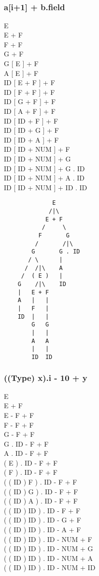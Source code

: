 \subsection{}
\subsubsection{a{[}i+1{]} + b.field}
E \\
E + F \\
F + F \\
G + F \\
G {[} E {]} + F \\
A {[} E {]} + F \\
ID {[} E + F {]} + F \\
ID {[} F + F {]} + F \\
ID {[} G + F {]} + F \\
ID {[} A + F {]} + F \\
ID {[} ID + F {]} + F \\
ID {[} ID + G {]} + F \\
ID {[} ID + A {]} + F \\
ID {[} ID + NUM {]} + F \\
ID {[} ID + NUM {]} + G \\
ID {[} ID + NUM {]} + G . ID \\
ID {[} ID + NUM {]} + A . ID \\
ID {[} ID + NUM {]} + ID . ID

\begin{verbatim}
              E
             /|\
            E + F
           /     \
          F       G
         /       /|\
        G       G . ID
       / \      |
      /  /|\    A
     /  ( E )   |
    G    /|\    ID
    |   E + F
    A   |   |
    |   F   |
    ID  |   |
        G   G
        |   |
        A   A
        |   |
        ID  ID
\end{verbatim}

\subsubsection{((Type) x).i - 10 + y}
E \\
E + F \\
E - F + F \\
F - F + F \\
G - F + F \\
G . ID - F + F \\
A . ID - F + F \\
( E ) . ID - F + F \\
( F ) . ID - F + F \\
( ( ID ) F ) . ID - F + F \\
( ( ID ) G ) . ID - F + F \\
( ( ID ) A ) . ID - F + F \\
( ( ID ) ID ) . ID - F + F \\
( ( ID ) ID ) . ID - G + F \\
( ( ID ) ID ) . ID - A + F \\
( ( ID ) ID ) . ID - NUM + F \\
( ( ID ) ID ) . ID - NUM + G \\
( ( ID ) ID ) . ID - NUM + A \\
( ( ID ) ID ) . ID - NUM + ID

